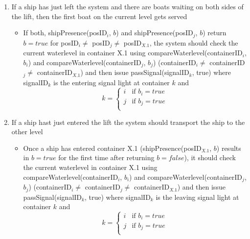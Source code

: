 \begin{enumerate}
	\item If a ship has just left the system and there are boats waiting on both sides of the lift, then the first boat on the current level gets served
		\begin{itemize}
			\item If both, shipPresence(posID$_i$, $b$) and shipPresence(posID$_j$, $b$) return $b = true$ for posID$_i \neq$ posID$_j \neq$ posID$_{X.1}$, the system should check the current waterlevel in container X.1 using \linebreak compareWaterlevel(containerID$_i$, $b_i$) and compareWaterlevel(containerID$_j$, $b_j$) (containerID$_i \neq$ containerID$_j \neq$ containerID$_{X.1}$) and then issue passSignal(signalID$_k$, true) where signalID$_k$ is the entering signal light at container $k$ and
			\begin{equation*}
				k = 
				\begin{cases}
					i & \text{if } b_i = true\\
					j & \text{if } b_j = true\\
				\end{cases}
			\end{equation*}
		\end{itemize}
		
	\item If a ship hast just entered the lift the system should transport the ship to the other level
		\begin{itemize}
			\item Once a ship has entered container X.1 (shipPresence(posID$_{X.1}$, $b$) results in $b = true$ for the first time after returning $b = false$), it should check the current waterlevel in container X.1 using \linebreak compareWaterlevel(containerID$_i$, $b_i$) and compareWaterlevel(containerID$_j$, $b_j$) (containerID$_i \neq$ containerID$_j \neq$ containerID$_{X.1}$) and then issue passSignal(signalID$_k$, true) where signalID$_k$ is the leaving signal light at container $k$ and
			\begin{equation*}
				k = 
				\begin{cases}
					i & \text{if } b_i = true\\
					j & \text{if } b_j = true\\
				\end{cases}
			\end{equation*}
		\end{itemize}
	\end{enumerate}